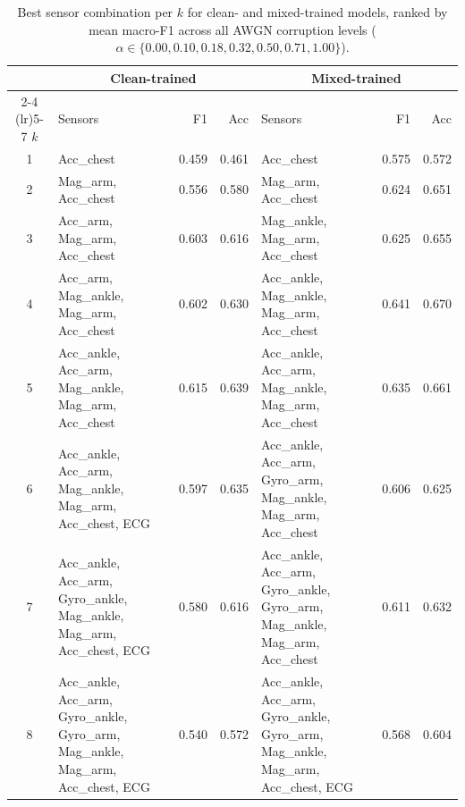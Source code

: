 \begin{table}[ht]
\centering
\caption{Best sensor combination per $k$ for clean- and mixed-trained models, ranked by mean macro-F1 across all AWGN corruption levels ($\alpha \in \{0.00, 0.10, 0.18, 0.32, 0.50, 0.71, 1.00\}$).}
\label{tab:best_per_k_clean_mixed}
\small
\setlength{\tabcolsep}{4pt}
\begin{tabular}{c l r r l r r}
\toprule
& \multicolumn{3}{c}{\textbf{Clean-trained}} & \multicolumn{3}{c}{\textbf{Mixed-trained}} \\
\cmidrule(lr){2-4} \cmidrule(lr){5-7}
$k$ & Sensors & F1 & Acc & Sensors & F1 & Acc \\
\midrule
1 & Acc\_chest & 0.459 & 0.461 & Acc\_chest & 0.575 & 0.572 \\
2 & Mag\_arm, Acc\_chest & 0.556 & 0.580 & Mag\_arm, Acc\_chest & 0.624 & 0.651 \\
3 & Acc\_arm, Mag\_arm, Acc\_chest & 0.603 & 0.616 & Mag\_ankle, Mag\_arm, Acc\_chest & 0.625 & 0.655 \\
4 & Acc\_arm, Mag\_ankle, Mag\_arm, Acc\_chest & 0.602 & 0.630 & Acc\_ankle, Mag\_ankle, Mag\_arm, Acc\_chest & 0.641 & 0.670 \\
5 & Acc\_ankle, Acc\_arm, Mag\_ankle, Mag\_arm, Acc\_chest & 0.615 & 0.639 & Acc\_ankle, Acc\_arm, Mag\_ankle, Mag\_arm, Acc\_chest & 0.635 & 0.661 \\
6 & Acc\_ankle, Acc\_arm, Mag\_ankle, Mag\_arm, Acc\_chest, ECG & 0.597 & 0.635 & Acc\_ankle, Acc\_arm, Gyro\_arm, Mag\_ankle, Mag\_arm, Acc\_chest & 0.606 & 0.625 \\
7 & Acc\_ankle, Acc\_arm, Gyro\_ankle, Mag\_ankle, Mag\_arm, Acc\_chest, ECG & 0.580 & 0.616 & Acc\_ankle, Acc\_arm, Gyro\_ankle, Gyro\_arm, Mag\_ankle, Mag\_arm, Acc\_chest & 0.611 & 0.632 \\
8 & Acc\_ankle, Acc\_arm, Gyro\_ankle, Gyro\_arm, Mag\_ankle, Mag\_arm, Acc\_chest, ECG & 0.540 & 0.572 & Acc\_ankle, Acc\_arm, Gyro\_ankle, Gyro\_arm, Mag\_ankle, Mag\_arm, Acc\_chest, ECG & 0.568 & 0.604 \\
\bottomrule
\end{tabular}
\end{table}
